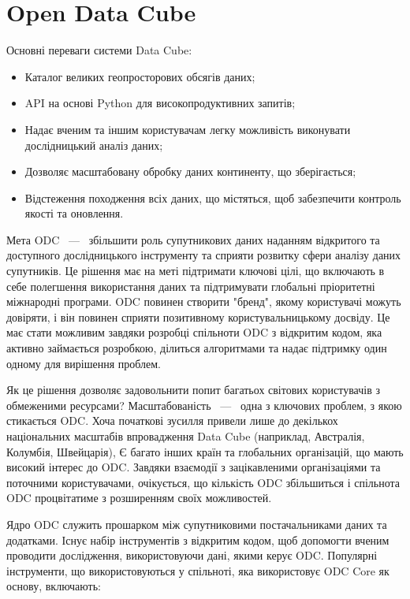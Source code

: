\section{Open Data Cube}

Основні переваги системи Data Cube:
\begin{itemize}
      \item Каталог великих геопросторових обсягів даних;
      \item API на основі Python для високопродуктивних запитів;
      \item Надає вченим та іншим користувачам легку можливість виконувати
	        дослідницький аналіз даних;
      \item Дозволяє масштабовану обробку даних континенту, що зберігається;
      \item Відстеження походження всіх даних, що містяться, щоб
	        забезпечити контроль якості та оновлення.
\end{itemize}

Мета ODC ~---~ збільшити роль супутникових даних %
наданням відкритого та доступного
дослідницького інструменту та сприяти %
розвитку сфери аналізу даних супутників.  Це
рішення має на меті підтримати ключові цілі, що %
включають в себе полегшення використання
даних та підтримувати глобальні пріоритетні %
міжнародні програми.  ODC повинен створити
"бренд", якому користувачі можуть довіряти, і %
він повинен сприяти позитивному
користувальницькому досвіду.  Це має стати %
можливим завдяки розробці спільноти ODC з
відкритим кодом, яка активно займається %
розробкою, ділиться алгоритмами та надає
підтримку один одному для вирішення проблем.


Як це рішення дозволяє задовольнити попит %
багатьох світових користувачів з обмеженими
ресурсами?  Масштабованість ~---~ одна з ключових %
проблем, з якою стикається ODC.  Хоча
початкові зусилля привели лише до декількох %
національних масштабів впровадження Data
Cube (наприклад, Австралія, Колумбія, Швейцарія), Є %
багато інших країн та глобальних
організацій, що мають високий інтерес до ODC.  %
Завдяки взаємодії з зацікавленими
організаціями та поточними користувачами, %
очікується, що кількість ODC збільшиться і
спільнота ODC процвітатиме з розширенням своїх %
можливостей.

Ядро ODC служить прошарком між супутниковими %
постачальниками даних та додатками.  Існує
набір інструментів з відкритим кодом, щоб %
допомогти вченим проводити дослідження,
використовуючи дані, якими керує ODC.  Популярні %
інструменти, що використовуються у
спільноті, яка використовує ODC Core як основу, %
включають:

